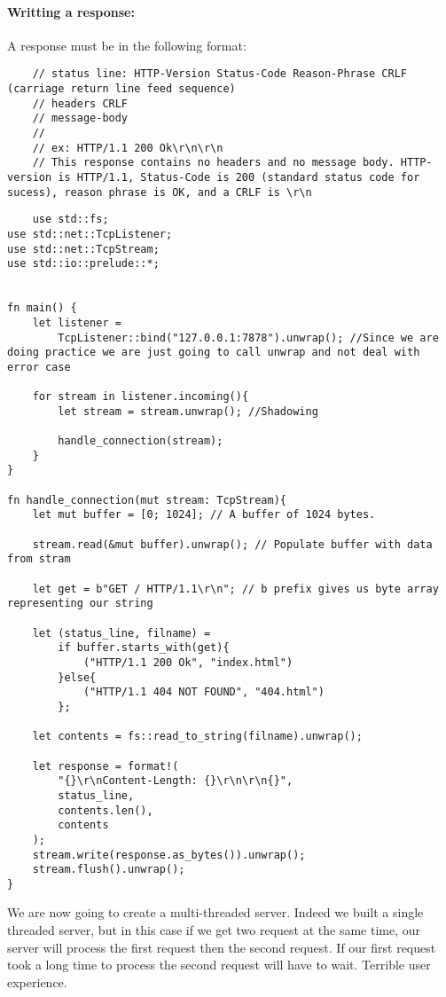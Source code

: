 \paragraph*{Writting a response:}
A response must be in the following format:
\begin{lstlisting}
    // status line: HTTP-Version Status-Code Reason-Phrase CRLF (carriage return line feed sequence)
    // headers CRLF
    // message-body
    // 
    // ex: HTTP/1.1 200 Ok\r\n\r\n 
    // This response contains no headers and no message body. HTTP-version is HTTP/1.1, Status-Code is 200 (standard status code for sucess), reason phrase is OK, and a CRLF is \r\n 
\end{lstlisting}
\newpage
\begin{lstlisting}
    use std::fs;
use std::net::TcpListener;  
use std::net::TcpStream;
use std::io::prelude::*;


fn main() {
    let listener = 
        TcpListener::bind("127.0.0.1:7878").unwrap(); //Since we are doing practice we are just going to call unwrap and not deal with error case

    for stream in listener.incoming(){
        let stream = stream.unwrap(); //Shadowing

        handle_connection(stream);
    }
}

fn handle_connection(mut stream: TcpStream){
    let mut buffer = [0; 1024]; // A buffer of 1024 bytes.
    
    stream.read(&mut buffer).unwrap(); // Populate buffer with data from stram
    
    let get = b"GET / HTTP/1.1\r\n"; // b prefix gives us byte array representing our string

    let (status_line, filname) = 
        if buffer.starts_with(get){
            ("HTTP/1.1 200 Ok", "index.html")
        }else{
            ("HTTP/1.1 404 NOT FOUND", "404.html")
        };

    let contents = fs::read_to_string(filname).unwrap();

    let response = format!(
        "{}\r\nContent-Length: {}\r\n\r\n{}",
        status_line,
        contents.len(),
        contents
    );
    stream.write(response.as_bytes()).unwrap();
    stream.flush().unwrap();
}
\end{lstlisting}

\newpage
We are now going to create a multi-threaded server. Indeed we built a single threaded server, but in this case if we get two request at the same time, our server will process the first request then
the second request. If our first request took a long time to process the second request will have to wait. Terrible user experience.

